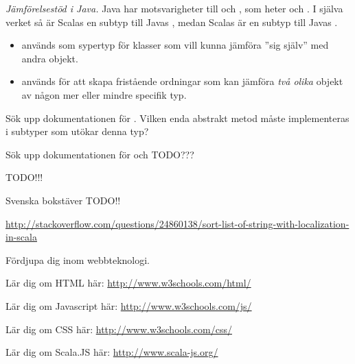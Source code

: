 \Task \emph{Jämförelsestöd i Java.} 
Java har motsvarigheter till  och , som heter  och . I själva verket så är Scalas  en subtyp till Javas , medan Scalas  är en subtyp till Javas . 
\begin{itemize}[nolistsep, noitemsep]
\item {} används som sypertyp för klasser som vill kunna jämföra ''sig själv'' med andra objekt.
\item {} används för att skapa fristående ordningar som kan jämföra \emph{två olika} objekt av någon mer eller mindre specifik typ.
\end{itemize}


\Subtask Sök upp dokumentationen för . Vilken enda abstrakt metod måste implementeras i subtyper som utökar denna typ? 

\Subtask Sök upp dokumentationen för  och TODO???

\Subtask
\begin{REPL}
TODO!!!
\end{REPL}


\Task \label{task:swedish-letter-ordering} Svenska bokstäver TODO!!

\url{http://stackoverflow.com/questions/24860138/sort-list-of-string-with-localization-in-scala} 


\Task Fördjupa dig inom webbteknologi. 
    
\Subtask Lär dig om HTML här: \url{http://www.w3schools.com/html/}

\Subtask Lär dig om Javascript här: \url{http://www.w3schools.com/js/}

\Subtask Lär dig om CSS här: \url{http://www.w3schools.com/css/}

\Subtask Lär dig om Scala.JS här: \url{http://www.scala-js.org/}



    